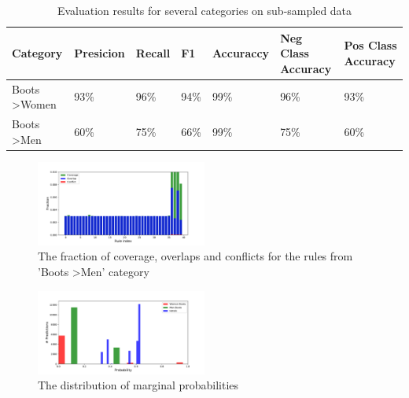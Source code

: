 \begin{table}
  \caption{Evaluation results for several categories on sub-sampled data}
  \label{tab:evaluation}
  \begin{tabular}{lllllll}
    \toprule
    Category & Presicion & Recall & F1 & Accuraccy & Neg Class Accuracy & Pos Class Accuracy\\
    \midrule
    Boots \textgreater Women  & 93\% & 96\% & 94\% & 99\% & 96\% & 93\% \\
    Boots \textgreater Men &  60\%  & 75\% & 66\% & 99\% & 75\% & 60\% \\
    \bottomrule
  \end{tabular}
\end{table}

\begin{figure}[th]
   \includegraphics[width=0.5\textwidth]{resources/covconflict}
   \caption{The fraction of coverage, overlaps and conflicts for the rules from 'Boots \textgreater Men' category}
   \label{fig:covconflict}
   \centering
\end{figure}
\begin{figure}[th]
   \includegraphics[width=0.5\textwidth]{resources/genmodel_pred_probs}
   \caption{The distribution of marginal probabilities}
   \label{fig:genmodel_pred_probs}
   \centering
\end{figure}

